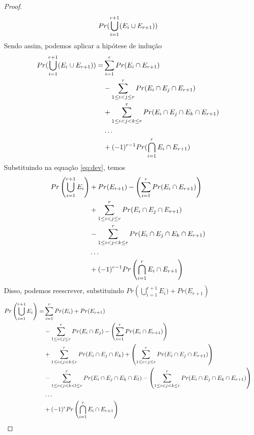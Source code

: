 \documentclass{article}
\begin{document}
\begin{proof}
    \begin{equation}
        \notag
        Pr(\bigcup_{i = 1}^{r+1}(E_i \cup E_{r+1}))
    \end{equation}
    Sendo assim, podemos aplicar a hipótese de indução
    \begin{equation}
    \notag
        \begin{split}
            Pr(\bigcup_{i = 1}^{r+1}(E_i \cup E_{r+1})) =& \sum\limits_{i=1}^{r}Pr(E_i \cap E_{r+1})\\
            & -\sum\limits_{1\leq i<j\leq r}^{r}Pr(E_i \cap E_j \cap E_{r+1})\\
            & +\sum\limits_{1\leq i<j<k\leq r}^{r}Pr(E_i \cap E_j \cap E_k \cap E_{r+1})\\
            & \ldots\\
            & +(-1)^{r-1}Pr(\bigcap_{i=1}^{r}E_i \cap E_{r+1})
        \end{split}
    \end{equation}
    Substituindo na equação \ref{eq:dev}, temos
    \begin{equation}
    \notag
        \begin{split}
            Pr\left(\bigcup_{i = 1}^{r+1}E_i\right)& + Pr(E_{r+1}) - \left(\sum\limits_{i=1}^{r}Pr(E_i \cap E_{r+1})\right)\\
            & +\sum\limits_{1\leq i<j\leq r}^{r}Pr(E_i \cap E_j \cap E_{r+1})\\
            & -\sum\limits_{1\leq i<j<k\leq r}^{r}Pr(E_i \cap E_j \cap E_k \cap E_{r+1})\\
            & \ldots\\
            & +(-1)^{r-1}Pr\left(\bigcap_{i=1}^{r}E_i \cap E_{r+1}\right)
        \end{split}
    \end{equation}
    Disso, podemos reescrever, substituindo $Pr\left(\bigcup_{i = 1}^{r+1}E_i) + Pr(E_{r+1}\right)$
    \begin{equation}
    \notag
        \begin{split}
            Pr\left(\bigcup_{i = 1}^{r+1}E_i\right) =& \sum\limits_{i=1}^{r}Pr(E_i) + Pr(E_{r+1})\\
            & -\sum\limits_{1\leq i<j\leq r}^{r}Pr(E_i \cap E_j) - \left(\sum\limits_{i=1}^{r}Pr(E_i \cap E_{r+1})\right)\\
            & +\sum\limits_{1\leq i<j<k\leq r}^{r}Pr(E_i \cap E_j \cap E_k) + \left(\sum\limits_{1\leq i<j\leq r}^{r}Pr(E_i \cap E_j \cap E_{r+1})\right)\\
            & -\sum\limits_{1\leq i<j<k<l\leq r}^{r}Pr(E_i \cap E_j \cap E_k \cap E_l) - \left(\sum\limits_{1\leq i<j<k\leq r}^{r}Pr(E_i \cap E_j \cap E_k \cap E_{r+1})\right)\\
            & \ldots\\
            & +(-1)^{r}Pr\left(\bigcap_{i=1}^{r}E_i \cap E_{r+1}\right)
        \end{split}
    \end{equation}
\end{proof}
\end{document}
